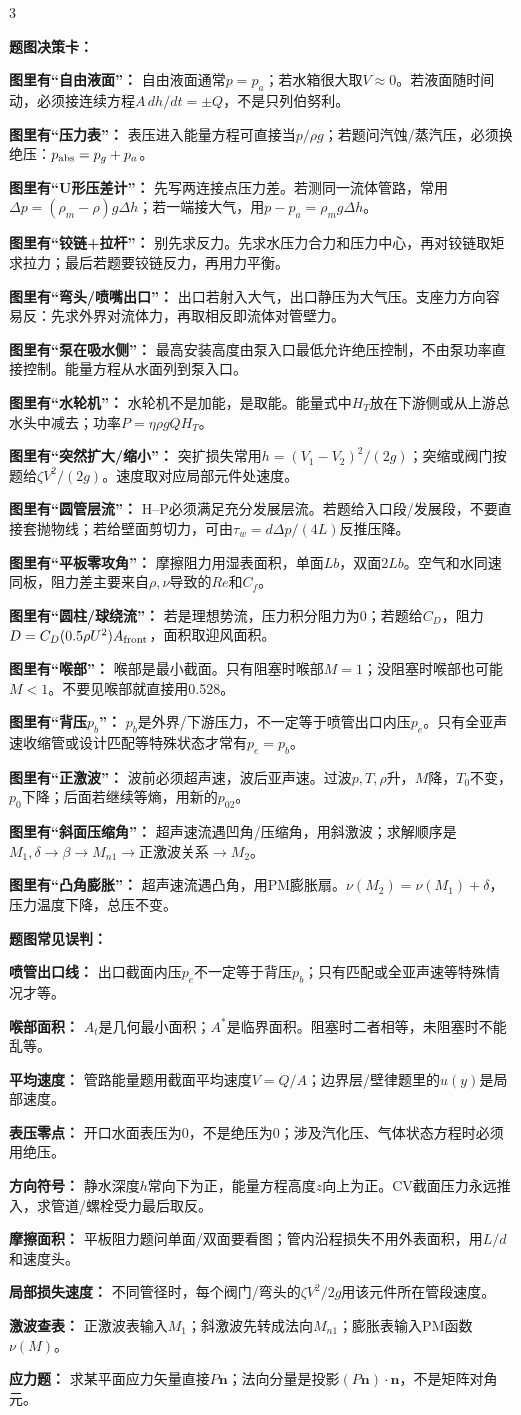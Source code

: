 \documentclass[a4paper]{article}
\newcommand{\sect}[1]{\par{\bfseries\color{Q}#1：}}
\begin{document}
\begin{multicols}{3}
{\sect{题图决策卡}
\sect{图里有“自由液面”}
自由液面通常$p=p_a$；若水箱很大取$V\approx0$。若液面随时间动，必须接连续方程$A\,dh/dt=\pm Q$，不是只列伯努利。
\sect{图里有“压力表”}
表压进入能量方程可直接当$p/\rho g$；若题问汽蚀/蒸汽压，必须换绝压：$p_{\rm abs}=p_g+p_a$。
\sect{图里有“U形压差计”}
先写两连接点压力差。若测同一流体管路，常用$\Delta p=(\rho_m-\rho)g\Delta h$；若一端接大气，用$p-p_a=\rho_m g\Delta h$。
\sect{图里有“铰链+拉杆”}
别先求反力。先求水压力合力和压力中心，再对铰链取矩求拉力；最后若题要铰链反力，再用力平衡。
\sect{图里有“弯头/喷嘴出口”}
出口若射入大气，出口静压为大气压。支座力方向容易反：先求外界对流体力，再取相反即流体对管壁力。
\sect{图里有“泵在吸水侧”}
最高安装高度由泵入口最低允许绝压控制，不由泵功率直接控制。能量方程从水面列到泵入口。
\sect{图里有“水轮机”}
水轮机不是加能，是取能。能量式中$H_T$放在下游侧或从上游总水头中减去；功率$P=\eta\rho gQH_T$。
\sect{图里有“突然扩大/缩小”}
突扩损失常用$h=(V_1-V_2)^2/(2g)$；突缩或阀门按题给$\zeta V^2/(2g)$。速度取对应局部元件处速度。
\sect{图里有“圆管层流”}
H--P必须满足充分发展层流。若题给入口段/发展段，不要直接套抛物线；若给壁面剪切力，可由$\tau_w=d\Delta p/(4L)$反推压降。
\sect{图里有“平板零攻角”}
摩擦阻力用湿表面积，单面$Lb$，双面$2Lb$。空气和水同速同板，阻力差主要来自$\rho,\nu$导致的$Re$和$C_f$。
\sect{图里有“圆柱/球绕流”}
若是理想势流，压力积分阻力为0；若题给$C_D$，阻力$D=C_D(0.5\rho U^2)A_{\rm front}$，面积取迎风面积。
\sect{图里有“喉部”}
喉部是最小截面。只有阻塞时喉部$M=1$；没阻塞时喉部也可能$M<1$。不要见喉部就直接用0.528。
\sect{图里有“背压$p_b$”}
$p_b$是外界/下游压力，不一定等于喷管出口内压$p_e$。只有全亚声速收缩管或设计匹配等特殊状态才常有$p_e=p_b$。
\sect{图里有“正激波”}
波前必须超声速，波后亚声速。过波$p,T,\rho$升，$M$降，$T_0$不变，$p_0$下降；后面若继续等熵，用新的$p_{02}$。
\sect{图里有“斜面压缩角”}
超声速流遇凹角/压缩角，用斜激波；求解顺序是$M_1,\delta\to\beta\to M_{n1}\to$正激波关系$\to M_2$。
\sect{图里有“凸角膨胀”}
超声速流遇凸角，用PM膨胀扇。$\nu(M_2)=\nu(M_1)+\delta$，压力温度下降，总压不变。

\sect{题图常见误判}
\sect{喷管出口线}
出口截面内压$p_e$不一定等于背压$p_b$；只有匹配或全亚声速等特殊情况才等。
\sect{喉部面积}
$A_t$是几何最小面积；$A^*$是临界面积。阻塞时二者相等，未阻塞时不能乱等。
\sect{平均速度}
管路能量题用截面平均速度$V=Q/A$；边界层/壁律题里的$u(y)$是局部速度。
\sect{表压零点}
开口水面表压为0，不是绝压为0；涉及汽化压、气体状态方程时必须用绝压。
\sect{方向符号}
静水深度$h$常向下为正，能量方程高度$z$向上为正。CV截面压力永远推入，求管道/螺栓受力最后取反。
\sect{摩擦面积}
平板阻力题问单面/双面要看图；管内沿程损失不用外表面积，用$L/d$和速度头。
\sect{局部损失速度}
不同管径时，每个阀门/弯头的$\zeta V^2/2g$用该元件所在管段速度。
\sect{激波查表}
正激波表输入$M_1$；斜激波先转成法向$M_{n1}$；膨胀表输入PM函数$\nu(M)$。
\sect{应力题}
求某平面应力矢量直接$P\bm n$；法向分量是投影$(P\bm n)\cdot\bm n$，不是矩阵对角元。

}
\end{multicols}
\end{document}
